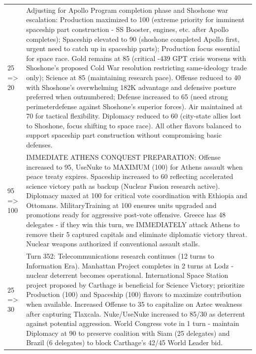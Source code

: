 \begin{longtable}{p{}p{}}
25 => 20 & Adjusting for Apollo Program completion phase and Shoshone war escalation: Production maximized to 100 (extreme priority for imminent spaceship part construction - SS Booster, engines, etc. after Apollo completes); Spaceship elevated to 90 (shoshone completed Apollo first, urgent need to catch up in spaceship parts); Production focus essential for space race. Gold remains at 85 (critical -439 GPT crisis worsens with Shoshone's proposed Cold War resolution restricting same-ideology trade only); Science at 85 (maintaining research pace). Offense reduced to 40 with Shoshone's overwhelming 182K advantage and defensive posture preferred when outnumbered; Defense increased to 65 (need strong perimeterdefense against Shoshone's superior forces). Air maintained at 70 for tactical flexibility. Diplomacy reduced to 60 (city-state allies lost to Shoshone, focus shifting to space race). All other flavors balanced to support spaceship part construction without compromising basic defenses. \\
95 => 100 & IMMEDIATE ATHENS CONQUEST PREPARATION: Offense increased to 95, UseNuke to MAXIMUM (100) for Athens assault when peace treaty expires. Spaceship increased to 60 reflecting accelerated science victory path as backup (Nuclear Fusion research active). Diplomacy maxed at 100 for critical vote coordination with Ethiopia and Ottomans. MilitaryTraining at 100 ensures units upgraded and promotions ready for aggressive post-vote offensive. Greece has 48 delegates - if they win this turn, we IMMEDIATELY attack Athens to remove their 5 captured capitals and eliminate diplomatic victory threat. Nuclear weapons authorized if conventional assault stalls. \\
25 => 30 & Turn 352: Telecommunications research continues (12 turns to Information Era). Manhattan Project completes in 2 turns at Lodz - nuclear deterrent becomes operational. International Space Station project proposed by Carthage is beneficial for Science Victory; prioritize Production (100) and Spaceship (100) flavors to maximize contribution when available. Increased Offense to 35 to capitalize on Aztec weakness after capturing Tlaxcala. Nuke/UseNuke increased to 85/30 as deterrent against potential aggression. World Congress vote in 1 turn - maintain Diplomacy at 90 to preserve coalition with Siam (25 delegates) and Brazil (6 delegates) to block Carthage's 42/45 World Leader bid. \\

\end{longtable}
